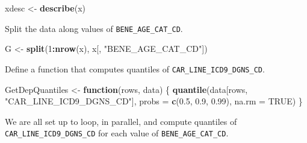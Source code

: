 \documentclass[]{book}
\newenvironment{Shaded}{\begin{snugshade}}{\end{snugshade}}
\newcommand{\ControlFlowTok}[1]{\textcolor[rgb]{0.13,0.29,0.53}{\textbf{#1}}}
\newcommand{\DataTypeTok}[1]{\textcolor[rgb]{0.13,0.29,0.53}{#1}}
\newcommand{\DecValTok}[1]{\textcolor[rgb]{0.00,0.00,0.81}{#1}}
\newcommand{\FloatTok}[1]{\textcolor[rgb]{0.00,0.00,0.81}{#1}}
\newcommand{\KeywordTok}[1]{\textcolor[rgb]{0.13,0.29,0.53}{\textbf{#1}}}
\newcommand{\NormalTok}[1]{#1}
\newcommand{\OperatorTok}[1]{\textcolor[rgb]{0.81,0.36,0.00}{\textbf{#1}}}
\newcommand{\OtherTok}[1]{\textcolor[rgb]{0.56,0.35,0.01}{#1}}
\newcommand{\StringTok}[1]{\textcolor[rgb]{0.31,0.60,0.02}{#1}}
\theoremstyle{definition}
\theoremstyle{definition}
\theoremstyle{definition}
\theoremstyle{remark}
\begin{document}
\begin{Shaded}
\begin{Highlighting}[]
\NormalTok{xdesc <-}\StringTok{ }\KeywordTok{describe}\NormalTok{(x) }
\end{Highlighting}
\end{Shaded}

Split the data along values of \texttt{BENE\_AGE\_CAT\_CD}.

\begin{Shaded}
\begin{Highlighting}[]
\NormalTok{G <-}\StringTok{ }\KeywordTok{split}\NormalTok{(}\DecValTok{1}\OperatorTok{:}\KeywordTok{nrow}\NormalTok{(x), x[, }\StringTok{"BENE_AGE_CAT_CD"}\NormalTok{]) }
\end{Highlighting}
\end{Shaded}

Define a function that computes quantiles of \texttt{CAR\_LINE\_ICD9\_DGNS\_CD}.

\begin{Shaded}
\begin{Highlighting}[]
\NormalTok{GetDepQuantiles <-}\StringTok{ }\ControlFlowTok{function}\NormalTok{(rows, data) \{}
 \KeywordTok{quantile}\NormalTok{(data[rows, }\StringTok{"CAR_LINE_ICD9_DGNS_CD"}\NormalTok{], }\DataTypeTok{probs =} \KeywordTok{c}\NormalTok{(}\FloatTok{0.5}\NormalTok{, }\FloatTok{0.9}\NormalTok{, }\FloatTok{0.99}\NormalTok{),}
 \DataTypeTok{na.rm =} \OtherTok{TRUE}\NormalTok{)}
\NormalTok{\}}
\end{Highlighting}
\end{Shaded}

We are all set up to loop, in parallel, and compute quantiles of \texttt{CAR\_LINE\_ICD9\_DGNS\_CD} for each value of \texttt{BENE\_AGE\_CAT\_CD}.

\begin{Shaded}
\end{Shaded}
\end{document}
